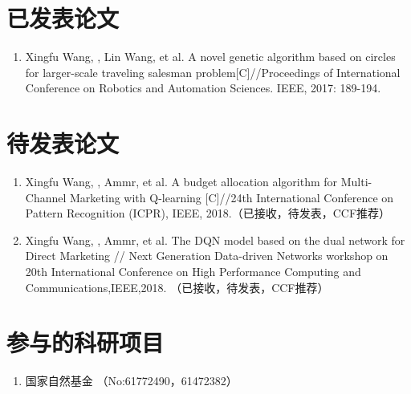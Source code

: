 ﻿\begin{publications}

\section*{已发表论文}

\begin{enumerate}
\item  Xingfu Wang, , Lin Wang, et al. A novel genetic algorithm based on circles for larger-scale traveling salesman problem[C]//Proceedings of International Conference on Robotics and Automation Sciences. IEEE, 2017: 189-194.
\end{enumerate}

\section*{待发表论文}

\begin{enumerate}
\item Xingfu Wang, , Ammr, et al. A budget allocation algorithm for Multi-Channel Marketing with Q-learning [C]//24th International Conference on Pattern Recognition (ICPR), IEEE, 2018.（已接收，待发表，CCF推荐）

\item Xingfu Wang, , Ammr, et al. The DQN model based on the dual network for Direct Marketing // Next Generation Data-driven Networks workshop on 20th International Conference on High Performance Computing and Communications,IEEE,2018. （已接收，待发表，CCF推荐）



\end{enumerate}

\section*{参与的科研项目}
\begin{enumerate}
\item 国家自然基金 （No:61772490，61472382）

\end{enumerate}

\end{publications}
